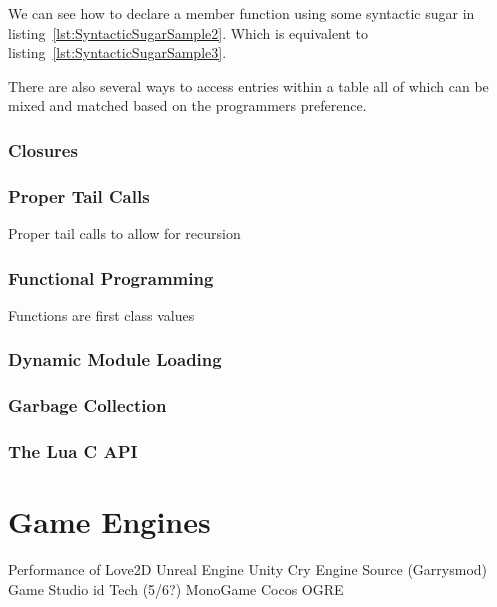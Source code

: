 \documentclass[11pt,a4paper,titlepage]{article}
\begin{document}
	
	We can see how to declare a member function using some syntactic sugar in listing~\ref{lst:SyntacticSugarSample2}. Which is equivalent to listing~\ref{lst:SyntacticSugarSample3}.

	

	There are also several ways to access entries within a table all of which can be mixed and matched based on the programmers preference.

	

\subsubsection{Closures}

\subsubsection{Proper Tail Calls}
Proper tail calls to allow for recursion

\subsubsection{Functional Programming}
Functions are first class values

\subsubsection{Dynamic Module Loading}

\subsubsection{Garbage Collection}

\subsubsection{The Lua C API}

\newpage
\section{Game Engines}
	
		Performance of
			Love2D
			Unreal 
			Engine 
			Unity 
			Cry Engine 
			Source (Garrysmod)
			Game Studio
			id Tech (5/6?)
			MonoGame
			Cocos
			OGRE
			
\newpage
\printbibliography{}
\end{document}
